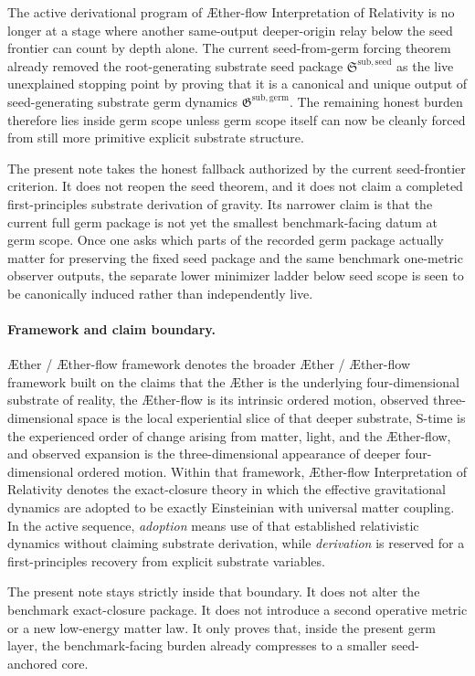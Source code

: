 \documentclass[11pt]{article}
\newcommand{\Aether}{\AE{}ther}
\newcommand{\Aflow}{\AE{}ther-flow}
\newcommand{\TheoryName}{\Aflow{} Interpretation of Relativity}
\newcommand{\TheoryProgram}{\Aether{} / \Aflow{} framework}
\newcommand{\SeedPackage}{\mathfrak S^{\mathrm{sub,seed}}}
\newcommand{\GermPackage}{\mathfrak G^{\mathrm{sub,germ}}}
\begin{document}
The active derivational program of \TheoryName{} is no longer at a stage where another same-output deeper-origin relay below the seed frontier can count by depth alone. The current seed-from-germ forcing theorem already removed the root-generating substrate seed package \(\SeedPackage\) as the live unexplained stopping point by proving that it is a canonical and unique output of seed-generating substrate germ dynamics \(\GermPackage\). The remaining honest burden therefore lies inside germ scope unless germ scope itself can now be cleanly forced from still more primitive explicit substrate structure.

The present note takes the honest fallback authorized by the current seed-frontier criterion. It does not reopen the seed theorem, and it does not claim a completed first-principles substrate derivation of gravity. Its narrower claim is that the current full germ package is not yet the smallest benchmark-facing datum at germ scope. Once one asks which parts of the recorded germ package actually matter for preserving the fixed seed package and the same benchmark one-metric observer outputs, the separate lower minimizer ladder below seed scope is seen to be canonically induced rather than independently live.

\paragraph{Framework and claim boundary.}
\TheoryProgram{} denotes the broader \Aether{} / \Aflow{} framework built on the claims that the \Aether{} is the underlying four-dimensional substrate of reality, the \Aflow{} is its intrinsic ordered motion, observed three-dimensional space is the local experiential slice of that deeper substrate, S-time is the experienced order of change arising from matter, light, and the \Aflow{}, and observed expansion is the three-dimensional appearance of deeper four-dimensional ordered motion. Within that framework, \TheoryName{} denotes the exact-closure theory in which the effective gravitational dynamics are adopted to be exactly Einsteinian with universal matter coupling. In the active sequence, \emph{adoption} means use of that established relativistic dynamics without claiming substrate derivation, while \emph{derivation} is reserved for a first-principles recovery from explicit substrate variables.

The present note stays strictly inside that boundary. It does not alter the benchmark exact-closure package. It does not introduce a second operative metric or a new low-energy matter law. It only proves that, inside the present germ layer, the benchmark-facing burden already compresses to a smaller seed-anchored core.
\end{document}
